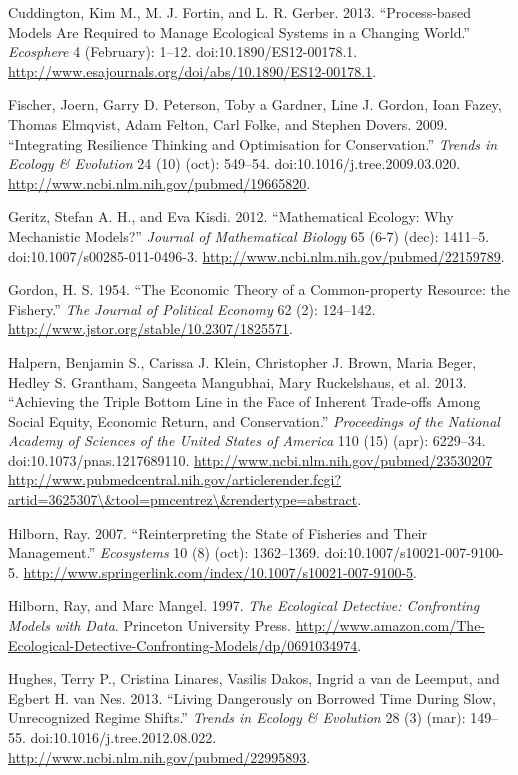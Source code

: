 \documentclass[author-year, review]{elsarticle} %
\begin{document}
Cuddington, Kim M., M. J. Fortin, and L. R. Gerber. 2013.
``Process-based Models Are Required to Manage Ecological Systems in a
Changing World.'' \emph{Ecosphere} 4 (February): 1--12.
doi:10.1890/ES12-00178.1.
\url{http://www.esajournals.org/doi/abs/10.1890/ES12-00178.1}.

Fischer, Joern, Garry D. Peterson, Toby a Gardner, Line J. Gordon, Ioan
Fazey, Thomas Elmqvist, Adam Felton, Carl Folke, and Stephen Dovers.
2009. ``Integrating Resilience Thinking and Optimisation for
Conservation.'' \emph{Trends in Ecology \& Evolution} 24 (10) (oct):
549--54. doi:10.1016/j.tree.2009.03.020.
\url{http://www.ncbi.nlm.nih.gov/pubmed/19665820}.

Geritz, Stefan A. H., and Eva Kisdi. 2012. ``Mathematical Ecology: Why
Mechanistic Models?'' \emph{Journal of Mathematical Biology} 65 (6-7)
(dec): 1411--5. doi:10.1007/s00285-011-0496-3.
\url{http://www.ncbi.nlm.nih.gov/pubmed/22159789}.

Gordon, H. S. 1954. ``The Economic Theory of a Common-property Resource:
the Fishery.'' \emph{The Journal of Political Economy} 62 (2): 124--142.
\url{http://www.jstor.org/stable/10.2307/1825571}.

Halpern, Benjamin S., Carissa J. Klein, Christopher J. Brown, Maria
Beger, Hedley S. Grantham, Sangeeta Mangubhai, Mary Ruckelshaus, et al.
2013. ``Achieving the Triple Bottom Line in the Face of Inherent
Trade-offs Among Social Equity, Economic Return, and Conservation.''
\emph{Proceedings of the National Academy of Sciences of the United
States of America} 110 (15) (apr): 6229--34.
doi:10.1073/pnas.1217689110.
\href{http://www.ncbi.nlm.nih.gov/pubmed/23530207 http://www.pubmedcentral.nih.gov/articlerender.fcgi?artid=3625307/\&tool=pmcentrez/\&rendertype=abstract}{http://www.ncbi.nlm.nih.gov/pubmed/23530207
http://www.pubmedcentral.nih.gov/articlerender.fcgi?artid=3625307\textbackslash{}\&tool=pmcentrez\textbackslash{}\&rendertype=abstract}.

Hilborn, Ray. 2007. ``Reinterpreting the State of Fisheries and Their
Management.'' \emph{Ecosystems} 10 (8) (oct): 1362--1369.
doi:10.1007/s10021-007-9100-5.
\url{http://www.springerlink.com/index/10.1007/s10021-007-9100-5}.

Hilborn, Ray, and Marc Mangel. 1997. \emph{The Ecological Detective:
Confronting Models with Data}. Princeton University Press.
\url{http://www.amazon.com/The-Ecological-Detective-Confronting-Models/dp/0691034974}.

Hughes, Terry P., Cristina Linares, Vasilis Dakos, Ingrid a van de
Leemput, and Egbert H. van Nes. 2013. ``Living Dangerously on Borrowed
Time During Slow, Unrecognized Regime Shifts.'' \emph{Trends in Ecology
\& Evolution} 28 (3) (mar): 149--55. doi:10.1016/j.tree.2012.08.022.
\url{http://www.ncbi.nlm.nih.gov/pubmed/22995893}.
\end{document}
